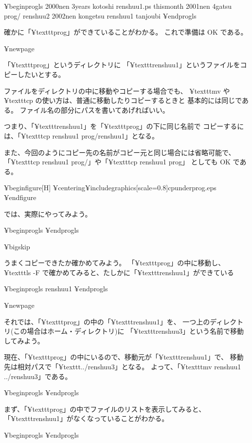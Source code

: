 {¥begin{progls}
2000nen         3years          kotoshi         renshuu1.ps     thismonth
2001nen         4gatsu          prog/           renshuu2
2002nen         kongetsu        renshuu1        tanjoubi
%
¥end{progls}

確かに「¥texttt{prog}」ができていることがわかる。
これで準備は OK である。

¥newpage

「¥texttt{prog}」というディレクトリに
「¥texttt{renshuu1}」というファイルをコピーしたいとする。

ファイルをディレクトリの中に移動やコピーする場合でも、
 ¥texttt{mv} や ¥texttt{cp} の使い方は、普通に移動したりコピーするときと
基本的には同じである。
ファイル名の部分にパスを書いてあげればいい。

つまり、「¥texttt{renshuu1}」を「¥texttt{prog}」の下に同じ名前で
コピーするには、「¥texttt{cp renshuu1 prog/renshuu1}」となる。

また、今回のようにコピー先の名前がコピー元と同じ場合には省略可能で、
「¥texttt{cp renshuu1 prog/}」や「¥texttt{cp renshuu1 prog}」
としても OK である。

¥begin{figure}[H]
¥centering{¥includegraphics[scale=0.8]{cpunderprog.eps}}
¥end{figure}

では、実際にやってみよう。

¥begin{progls}
%
¥end{progls}

¥bigskip

うまくコピーできたか確かめてみよう。
「¥texttt{prog}」の中に移動し、
¥texttt{ls -F} で確かめてみると、たしかに「¥texttt{renshuu1}」ができている

¥begin{progls}
renshuu1
%
¥end{progls}

¥newpage

それでは、「¥texttt{prog}」の中の「¥texttt{renshuu1}」を、
一つ上のディレクトリ(この場合はホーム・ディレクトリ)に
「¥texttt{renshuu3}」という名前で移動してみよう。

現在、「¥texttt{prog}」の中にいるので、移動元が「¥texttt{renshuu1}」で、
移動先は相対パスで「¥texttt{../renshuu3}」となる。
よって、「¥texttt{mv renshuu1 ../renshuu3}」である。

¥begin{progls}
%
¥end{progls}

まず、「¥texttt{prog}」の中でファイルのリストを表示してみると、
「¥texttt{renshuu1}」がなくなっていることがわかる。

¥begin{progls}
%
¥end{progls}

}
